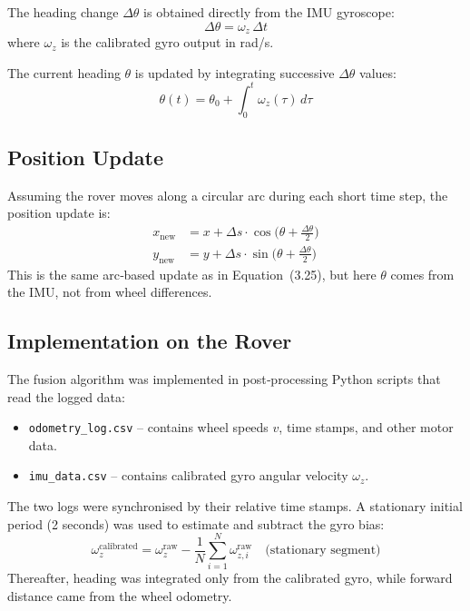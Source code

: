 The heading change \(\Delta\theta\) is obtained directly from the IMU gyroscope:
\begin{equation}
    \Delta\theta = \omega_z \,\Delta t
\end{equation}
where \(\omega_z\) is the calibrated gyro output in rad/s.

The current heading \(\theta\) is updated by integrating successive \(\Delta\theta\) values:
\begin{equation}
    \theta(t) = \theta_0 + \int_0^t \omega_z(\tau)\,d\tau
\end{equation}

\subsection{Position Update}
Assuming the rover moves along a circular arc during each short time step, the position update is:
\begin{equation}
    \begin{aligned}
        x_{\text{new}} &= x + \Delta s \cdot \cos\!\bigl(\theta + \tfrac{\Delta\theta}{2}\bigr) \\
        y_{\text{new}} &= y + \Delta s \cdot \sin\!\bigl(\theta + \tfrac{\Delta\theta}{2}\bigr)
    \end{aligned}
\end{equation}
This is the same arc‑based update as in Equation~(3.25), but here \(\theta\) comes from the IMU, not from wheel differences.

\subsection{Implementation on the Rover}
The fusion algorithm was implemented in post‑processing Python scripts that read the logged data:
\begin{itemize}
    \item \texttt{odometry\_log.csv} – contains wheel speeds \(v\), time stamps, and other motor data.
    \item \texttt{imu\_data.csv} – contains calibrated gyro angular velocity \(\omega_z\).
\end{itemize}
The two logs were synchronised by their relative time stamps. 
A stationary initial period (2 seconds) was used to estimate and subtract the gyro bias:
\begin{equation}
    \omega_z^{\text{calibrated}} = \omega_z^{\text{raw}} - \frac{1}{N}\sum_{i=1}^{N} \omega_{z,i}^{\text{raw}} \quad\text{(stationary segment)}
\end{equation}
Thereafter, heading was integrated only from the calibrated gyro, while forward distance came from the wheel odometry.

